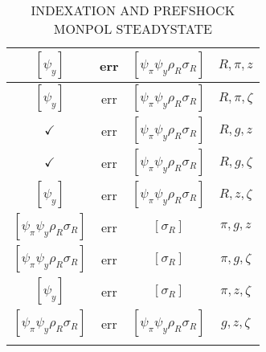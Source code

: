 \documentclass[a4paper,10pt]{article}
\begin{document}
\begin{longtable}{|c|c|c|c|}
\hline
$[\psi_y ]$ & err & $[\psi_\pi \psi_y \rho_R \sigma_R ]$ & ${R},{\pi},{z}$ \\
\hline
$[\psi_y ]$ & err & $[\psi_\pi \psi_y \rho_R \sigma_R ]$ & ${R},{\pi},{\zeta}$ \\
\hline
$\checkmark$ & err & $[\psi_\pi \psi_y \rho_R \sigma_R ]$ & ${R},{g},{z}$ \\
\hline
$\checkmark$ & err & $[\psi_\pi \psi_y \rho_R \sigma_R ]$ & ${R},{g},{\zeta}$ \\
\hline
$[\psi_y ]$ & err & $[\psi_\pi \psi_y \rho_R \sigma_R ]$ & ${R},{z},{\zeta}$ \\
\hline
$[\psi_\pi \psi_y \rho_R \sigma_R ]$ & err & $[\sigma_R ]$ & ${\pi},{g},{z}$ \\
\hline
$[\psi_\pi \psi_y \rho_R \sigma_R ]$ & err & $[\sigma_R ]$ & ${\pi},{g},{\zeta}$ \\
\hline
$[\psi_y ]$ & err & $[\sigma_R ]$ & ${\pi},{z},{\zeta}$ \\
\hline
$[\psi_\pi \psi_y \rho_R \sigma_R ]$ & err & $[\psi_\pi \psi_y \rho_R \sigma_R ]$ & ${g},{z},{\zeta}$ \\
\hline
\caption{INDEXATION AND PREFSHOCK MONPOL STEADYSTATE}
\label{table:MyTableLabel}
\end{longtable}
\end{document}
